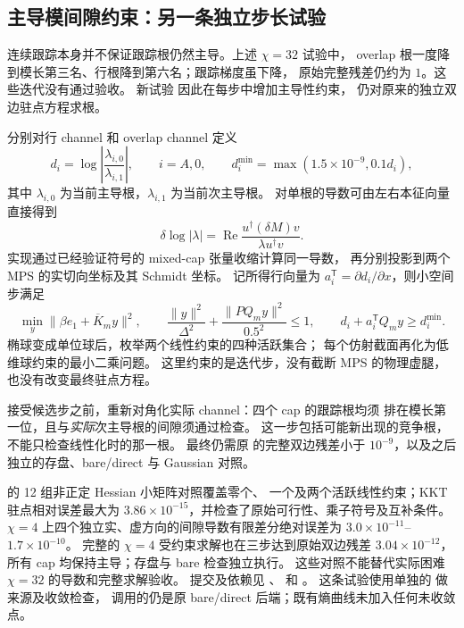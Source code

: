 \subsection{主导模间隙约束：另一条独立步长试验}
连续跟踪本身并不保证跟踪根仍然主导。上述 $\chi=32$ 试验中，
overlap 根一度降到模长第三名、行根降到第六名；跟踪梯度虽下降，
原始完整残差仍约为 $1$。这些迭代没有通过验收。
新试验  因此在每步中增加主导性约束，
仍对原来的独立双边驻点方程求根。

分别对行 channel 和 overlap channel 定义
\begin{equation}
 d_i=\log\left|\frac{\lambda_{i,0}}{\lambda_{i,1}}\right|,
 \qquad i=A,0,
 \qquad d_i^{\min}=\max(1.5\times10^{-9},0.1d_i),
\end{equation}
其中 $\lambda_{i,0}$ 为当前主导根，$\lambda_{i,1}$ 为当前次主导根。
对单根的导数可由左右本征向量直接得到
\begin{equation}
 \delta\log|\lambda|
 =\operatorname{Re}\frac{u^\dagger(\delta M)v}
 {\lambda u^\dagger v}.
\end{equation}
实现通过已经验证符号的 mixed-cap 张量收缩计算同一导数，
再分别投影到两个 MPS 的实切向坐标及其 Schmidt 坐标。
记所得行向量为 $a_i^\mathsf{T}=\partial d_i/\partial x$，则小空间步满足
\begin{equation}
 \min_y\|\beta e_1+\overline K_m y\|^2,
 \qquad
 \frac{\|y\|^2}{\Delta^2}+\frac{\|P Q_m y\|^2}{0.5^2}\leq1,
 \qquad d_i+a_i^\mathsf{T}Q_m y\geq d_i^{\min}.
\end{equation}
椭球变成单位球后，枚举两个线性约束的四种活跃集合；
每个仿射截面再化为低维球约束的最小二乘问题。
这里约束的是迭代步，没有截断 MPS 的物理虚腿，也没有改变最终驻点方程。

接受候选步之前，重新对角化实际 channel：四个 cap 的跟踪根均须
排在模长第一位，且与\emph{实际}次主导根的间隙须通过检查。
这一步包括可能新出现的竞争根，不能只检查线性化时的那一根。
最终仍需原  的完整双边残差小于 $10^{-9}$，以及之后
独立的存盘、bare/direct 与 Gaussian 对照。

 的 12 组非正定 Hessian 小矩阵对照覆盖零个、
一个及两个活跃线性约束；KKT 驻点相对误差最大为
$3.86\times10^{-15}$，并检查了原始可行性、乘子符号及互补条件。
$\chi=4$ 上四个独立实、虚方向的间隙导数有限差分绝对误差为
$3.0\times10^{-11}$--$1.7\times10^{-10}$。
完整的 $\chi=4$ 受约束求解也在三步达到原始双边残差
$3.04\times10^{-12}$，所有 cap 均保持主导；存盘与 bare 检查独立执行。
这些对照不能替代实际困难 $\chi=32$ 的导数和完整求解验收。
提交及依赖见 、
 和
。
这条试验使用单独的  做来源及收敛检查，
调用的仍是原 bare/direct 后端；既有熵曲线未加入任何未收敛点。



